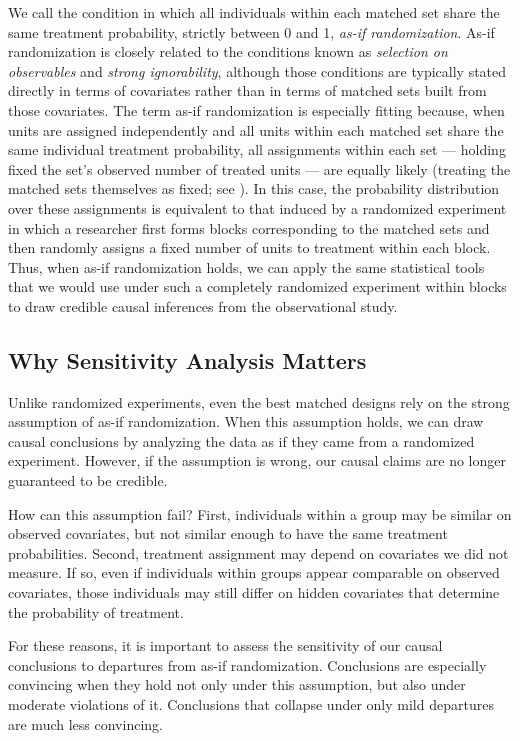 \documentclass[twoside,11pt]{article}
\begin{document}
We call the condition in which all individuals within each matched set
share the same treatment probability, strictly between 0 and 1,
\emph{as-if randomization}. As-if randomization is closely related to the
conditions known as \emph{selection on observables} and \emph{strong
ignorability}, although those conditions are typically stated directly in terms of covariates rather than in terms of matched sets built from those covariates. The term as-if randomization is especially
fitting because, when units are assigned independently and all units within each matched set share the same
individual treatment probability, all assignments within each set ---
holding fixed the set's observed number of treated units --- are equally
likely (treating the matched sets themselves as fixed; see
). In this case, the probability distribution over these
assignments is equivalent to that induced by a randomized experiment in
which a researcher first forms blocks corresponding to the matched sets
and then randomly assigns a fixed number of units to treatment within
each block. Thus, when as-if randomization holds, we can apply the same
statistical tools that we would use under such a completely randomized experiment within blocks
to draw credible causal inferences from the observational study.

\subsection{Why Sensitivity Analysis
Matters}\label{why-sensitivity-analysis-matters}

Unlike randomized experiments, even the best matched designs rely on
the strong assumption of as-if randomization. When this assumption
holds, we can draw causal conclusions by analyzing the data as if they
came from a randomized experiment. However, if the assumption is wrong,
our causal claims are no longer guaranteed to be credible.

How can this assumption fail? First, individuals within a group may be
similar on observed covariates, but not similar enough to have the same
treatment probabilities. Second, treatment assignment may depend on
covariates we did not measure. If so, even if individuals within groups
appear comparable on observed covariates, those individuals may still
differ on hidden covariates that determine the probability of treatment.

For these reasons, it is important to assess the sensitivity of our
causal conclusions to departures from as-if randomization. Conclusions
are especially convincing when they hold not only under this assumption,
but also under moderate violations of it. Conclusions that collapse
under only mild departures are much less convincing.
\end{document}
